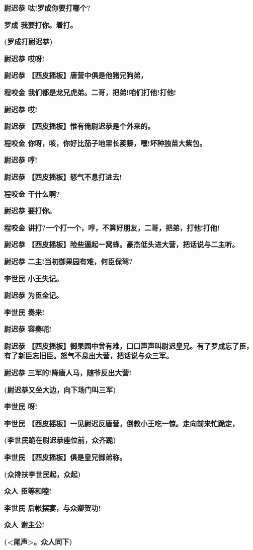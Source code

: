 \textbf{尉迟恭 呔!罗成你要打哪个?}

\textbf{罗成 我要打你。着打。}

\textbf{(罗成打尉迟恭)}

\textbf{尉迟恭 哎呀!}

\textbf{尉迟恭 【西皮摇板】唐营中俱是他猪兄狗弟，}

\textbf{程咬金 我们都是龙兄虎弟。二哥，把弟!咱们打他!打他!}

\textbf{尉迟恭 哎!}

\textbf{尉迟恭 【西皮摇板】惟有俺尉迟恭是个外来的。}

\textbf{程咬金 你呀，咳，你好比茄子地里长蒺藜，嘿!坏种独苗大紫包。}

\textbf{尉迟恭 哼!}

\textbf{尉迟恭 【西皮摇板】怒气不息打进去!}

\textbf{程咬金 干什么啊?}

\textbf{尉迟恭 要打你。}

\textbf{程咬金 讲打?一个打一个，哼，不算好朋友，二哥，把弟，打他!打他!}

\textbf{尉迟恭
【西皮摇板】险些逼起一窝蜂。豪杰低头进大营，把话说与二主听。}

\textbf{尉迟恭 二主!当初御果园有难，何臣保驾?}

\textbf{李世民 小王失记。}

\textbf{尉迟恭 为臣全记。}

\textbf{李世民 奏来!}

\textbf{尉迟恭 容奏呃!}

\textbf{尉迟恭
【西皮摇板】御果园中曾有难，口口声声叫尉迟皇兄。有了罗成忘了臣，有了新臣忘旧臣。怒气不息出大营，把话说与众三军。}

\textbf{尉迟恭 三军的!降唐人马，随爷反出大营!}

\textbf{(尉迟恭又坐大边，向下场门叫三军)}

\textbf{李世民 呀!}

\textbf{李世民
【西皮摇板】一见尉迟反唐营，倒教小王吃一惊。走向前来忙跪定，}

\textbf{(李世民跪在尉迟恭座位前，众齐跪)}

\textbf{李世民 【西皮摇板】俱是皇兄御弟称。}

\textbf{(众搀扶李世民起，众起)}

\textbf{众人 臣等和睦!}

\textbf{李世民 后帐摆宴，与众卿贺功!}

\textbf{众人 谢主公!}

\textbf{(\textless{}尾声\textgreater{}。众人同下)}

